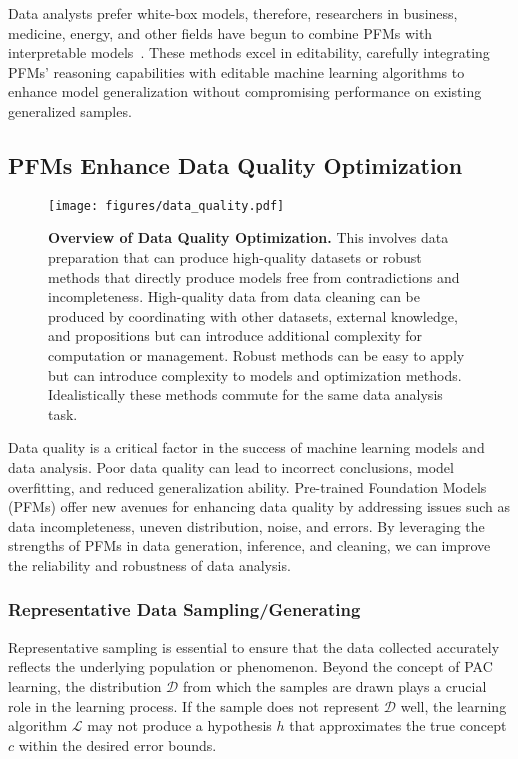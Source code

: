   Data analysts prefer white-box models, therefore, researchers in business, medicine, energy, and other fields have begun to combine PFMs with interpretable models~\cite{vertsel2024hybrid,gerussi2022llm,Zhang2024LargeLM}. These methods excel in editability, carefully integrating PFMs' reasoning capabilities with editable machine learning algorithms to enhance model generalization without compromising performance on existing generalized samples.
  
  
  \subsection{PFMs Enhance Data Quality Optimization}\label{sec:data_quality}
  
  \begin{figure*}[h]
    \centering
    \texttt{[image: figures/data\_quality.pdf]} %
    \caption{\textbf{Overview of Data Quality Optimization.} This involves data preparation that can produce high-quality datasets or robust methods that directly produce models free from contradictions and incompleteness. High-quality data from data cleaning can be produced by coordinating with other datasets, external knowledge, and propositions but can introduce additional complexity for computation or management. Robust methods can be easy to apply but can introduce complexity to models and optimization methods. Idealistically these methods commute for the same data analysis task.}
    \label{fig:data_quality}
  \end{figure*}
  
  
  Data quality is a critical factor in the success of machine learning models and data analysis. Poor data quality can lead to incorrect conclusions, model overfitting, and reduced generalization ability. Pre-trained Foundation Models (PFMs) offer new avenues for enhancing data quality by addressing issues such as data incompleteness, uneven distribution, noise, and errors. By leveraging the strengths of PFMs in data generation, inference, and cleaning, we can improve the reliability and robustness of data analysis.
  
  \subsubsection{Representative Data Sampling/Generating}\label{sec:sample_generating}
  
  Representative sampling is essential to ensure that the data collected accurately reflects the underlying population or phenomenon. Beyond the concept of PAC learning, the distribution $\mathcal{D}$ from which the samples are drawn plays a crucial role in the learning process. If the sample does not represent $\mathcal{D}$ well, the learning algorithm $\mathcal{L}$ may not produce a hypothesis $h$ that approximates the true concept $c$ within the desired error bounds.
  
